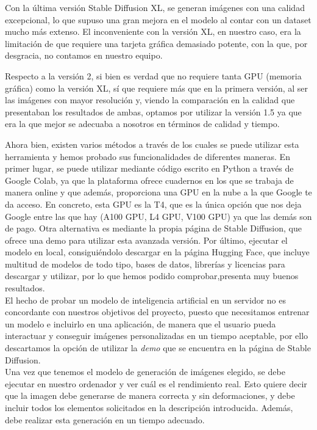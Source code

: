 Con la última versión Stable Diffusion XL, se generan imágenes con una calidad excepcional, lo que supuso una gran mejora en el modelo al contar con un dataset mucho más extenso. El inconveniente con la versión XL, en nuestro caso, era la limitación de que requiere una tarjeta gráfica demasiado potente, con la que, por desgracia, no contamos en nuestro equipo. 

Respecto a la versión 2, si bien es verdad que no requiere tanta GPU (memoria gráfica) como la versión XL, sí que requiere más que en la primera versión, al ser las imágenes con mayor resolución y, viendo la comparación en la calidad que presentaban los resultados de ambas, optamos por utilizar la versión 1.5 ya que era la que mejor se adecuaba a nosotros en términos de calidad y tiempo.


Ahora bien, existen varios métodos a través de los cuales se puede utilizar esta herramienta y hemos probado sus funcionalidades de diferentes maneras. En primer lugar, se puede utilizar mediante código escrito en Python a través de Google Colab, ya que la plataforma ofrece cuadernos en los que se trabaja de manera online y que además, proporciona una GPU en la nube a la que Google te da acceso. En concreto, esta GPU es la T4, que es la única opción que nos deja Google entre las que hay (A100 GPU, L4 GPU, V100 GPU) ya que las demás son de pago. Otra alternativa es mediante la propia página de Stable Diffusion, que ofrece una demo para utilizar esta avanzada versión. Por último, ejecutar el modelo en local, consiguiéndolo descargar en la página Hugging Face, que incluye multitud de modelos de todo tipo, bases de datos, librerías y licencias para descargar y utilizar, por lo que hemos podido comprobar,presenta muy buenos resultados.\\

El hecho de probar un modelo de inteligencia artificial en un servidor no es concordante con nuestros objetivos del proyecto, puesto que necesitamos entrenar un modelo e incluirlo en una aplicación, de manera que el usuario pueda interactuar y conseguir imágenes personalizadas en un tiempo aceptable, por ello descartamos la opción de utilizar la \textit{demo} que se encuentra en la página de Stable Diffusion. \\

Una vez que tenemos el modelo de generación de imágenes elegido, se debe ejecutar en nuestro ordenador y ver cuál es el rendimiento real. Esto quiere decir que la imagen debe generarse de manera correcta y sin deformaciones, y debe incluir todos los elementos solicitados en la descripción introducida. Además, debe realizar esta generación en un tiempo adecuado.\\

